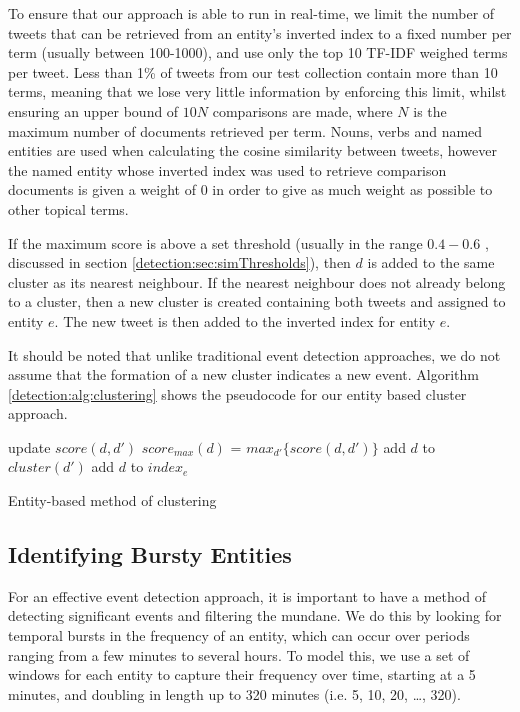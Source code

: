 To ensure that our approach is able to run in real-time, we limit the number of tweets that can be retrieved from an entity's inverted index to a fixed number per term (usually between 100-1000), and use only the top 10 TF-IDF weighed terms per tweet. Less than 1\% of tweets from our test collection contain more than 10 terms, meaning that we lose very little information by enforcing this limit, whilst ensuring an upper bound of \(10N\) comparisons are made, where \(N\) is the maximum number of documents retrieved per term. Nouns, verbs and named entities are used when calculating the cosine similarity between tweets, however the named entity whose inverted index was used to retrieve comparison documents is given a weight of 0 in order to give as much weight as possible to other topical terms.

If the maximum score is above a set threshold (usually in the range \(0.4-0.6\) \citep{Petrovic10}, discussed in section \ref{detection:sec:simThresholds}), then $d$ is added to the same cluster as its nearest neighbour. If the nearest neighbour does not already belong to a cluster, then a new cluster is created containing both tweets and assigned to entity $e$. The new tweet is then added to the inverted index for entity $e$.

It should be noted that unlike traditional event detection approaches, we do not assume that the formation of a new cluster indicates a new event. Algorithm \ref{detection:alg:clustering} shows the pseudocode for our entity based cluster approach.

\begin{algorithm}
 {
	 {
		 {
			 {
				update $score(d, d')$\;
			}
		}
		$score_{max}(d)$ = $max_{d'}\{score(d, d')\}$\;
		 {
			add $d$ to $cluster(d')$\;
		}
		add $d$ to $index_{e}$\;
	}
}
\caption{Entity-based method of clustering}
\label{detection:alg:clustering}
\end{algorithm}

\subsection{Identifying Bursty Entities}
For an effective event detection approach, it is important to have a method of detecting significant events and filtering the mundane. We do this by looking for temporal bursts in the frequency of an entity, which can occur over periods ranging from a few minutes to several hours. To model this, we use a set of windows for each entity to capture their frequency over time, starting at a 5 minutes, and doubling in length up to 320 minutes (i.e. 5, 10, 20, \ldots, 320).

